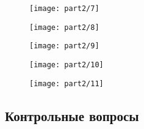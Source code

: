 \begin{figure}[H]
  \centering
  \texttt{[image: part2/7]}
\end{figure}

\begin{figure}[H]
  \centering
  \texttt{[image: part2/8]}
\end{figure}

\begin{figure}[H]
  \centering
  \texttt{[image: part2/9]}
\end{figure}

\begin{figure}[H]
  \centering
  \texttt{[image: part2/10]}
\end{figure}

\begin{figure}[H]
  \centering
  \texttt{[image: part2/11]}
\end{figure}

\subsection{Контрольные вопросы}

